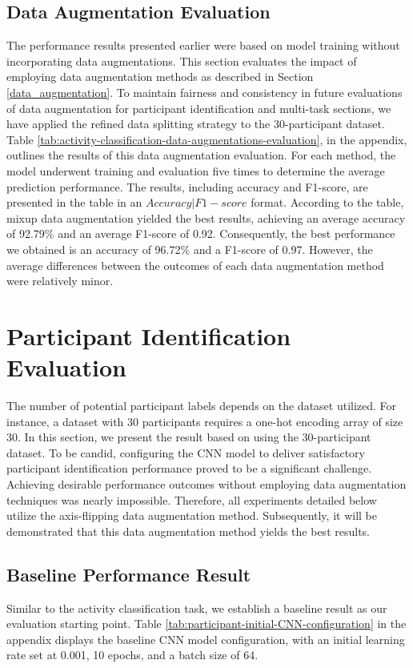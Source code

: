 \documentclass{l4proj}
\begin{document}
\subsection{Data Augmentation Evaluation}
The performance results presented earlier were based on model training without incorporating data augmentations. This section evaluates the impact of employing data augmentation methods as described in Section \ref{data_augmentation}. To maintain fairness and consistency in future evaluations of data augmentation for participant identification and multi-task sections, we have applied the refined data splitting strategy to the 30-participant dataset. Table \ref{tab:activity-classification-data-augmentations-evaluation}, in the appendix, outlines the results of this data augmentation evaluation. For each method, the model underwent training and evaluation five times to determine the average prediction performance. The results, including accuracy and F1-score, are presented in the table in an $Accuracy | F1-score$ format. According to the table, mixup data augmentation yielded the best results, achieving an average accuracy of 92.79\% and an average F1-score of 0.92. Consequently, the best performance we obtained is an accuracy of 96.72\% and a F1-score of 0.97. However, the average differences between the outcomes of each data augmentation method were relatively minor.

\section{Participant Identification Evaluation}
The number of potential participant labels depends on the dataset utilized. For instance, a dataset with 30 participants requires a one-hot encoding array of size 30. In this section, we present the result based on using the 30-participant dataset. To be candid, configuring the CNN model to deliver satisfactory participant identification performance proved to be a significant challenge.  Achieving desirable performance outcomes without employing data augmentation techniques was nearly impossible. Therefore, all experiments detailed below utilize the axis-flipping data augmentation method. Subsequently, it will be demonstrated that this data augmentation method yields the best results.

\subsection{Baseline Performance Result}
Similar to the activity classification task, we establish a baseline result as our evaluation starting point. Table \ref{tab:participant-initial-CNN-configuration} in the appendix displays the baseline CNN model configuration, with an initial learning rate set at 0.001, 10 epochs, and a batch size of 64.
\end{document}
